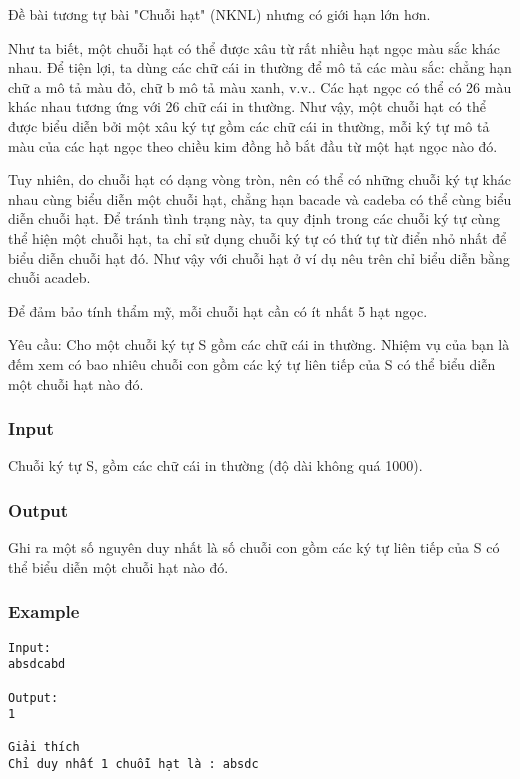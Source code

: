 



   Đề bài tương tự bài "Chuỗi hạt" (NKNL) nhưng có giới hạn lớn hơn.  

   Như ta biết, một chuỗi hạt có thể được xâu từ rất nhiều hạt ngọc màu sắc khác nhau. Để tiện lợi, ta dùng các chữ cái in thường để mô tả các màu sắc: chẳng hạn chữ a mô tả màu đỏ, chữ b mô tả màu xanh, v.v.. Các hạt ngọc có thể có 26 màu khác nhau tương ứng với 26 chữ cái in thường. Như vậy, một chuỗi hạt có thể được biểu diễn bởi một xâu ký tự gồm các chữ cái in thường, mỗi ký tự mô tả màu của các hạt ngọc theo chiều kim đồng hồ bắt đầu từ một hạt ngọc nào đó.  

   Tuy nhiên, do chuỗi hạt có dạng vòng tròn, nên có thể có những chuỗi ký tự khác nhau cùng biểu diễn một chuỗi hạt, chẳng hạn bacade và cadeba có thể cùng biểu diễn chuỗi hạt. Để tránh tình trạng này, ta quy định trong các chuỗi ký tự cùng thể hiện một chuỗi hạt, ta chỉ sử dụng chuỗi ký tự có thứ tự từ điển nhỏ nhất để biểu diễn chuỗi hạt đó. Như vậy với chuỗi hạt ở ví dụ nêu trên chỉ biểu diễn bằng chuỗi acadeb.  

   Để đảm bảo tính thẩm mỹ, mỗi chuỗi hạt cần có ít nhất 5 hạt ngọc.  

   Yêu cầu: Cho một chuỗi ký tự S gồm các chữ cái in thường. Nhiệm vụ của bạn là đếm xem có bao nhiêu chuỗi con gồm các ký tự liên tiếp của S có thể biểu diễn một chuỗi hạt nào đó.  

\subsubsection{   Input  }

   Chuỗi ký tự S, gồm các chữ cái in thường (độ dài không quá 1000).  

\subsubsection{   Output  }

   Ghi ra một số nguyên duy nhất là số chuỗi con gồm các ký tự liên tiếp của S có thể biểu diễn một chuỗi hạt nào đó.  

\subsubsection{   Example  }
\begin{verbatim}
Input:
absdcabd

Output:
1

Giải thích
Chỉ duy nhất 1 chuỗi hạt là : absdc

\end{verbatim}